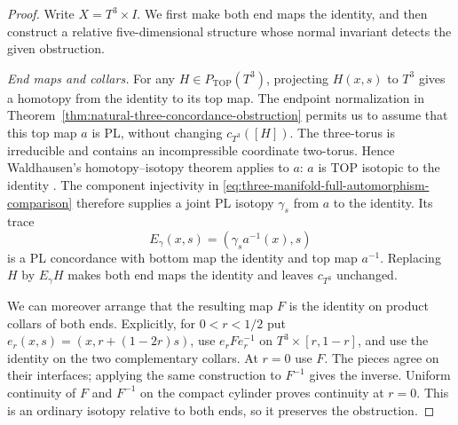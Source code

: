 \begin{proof}
Write $X=T^3\times I$.  We first make both end maps the
identity, and then construct a relative five-dimensional
structure whose normal invariant detects the given obstruction.

\emph{End maps and collars.}
For any $H\in P_{\mathrm{TOP}}(T^3)$, projecting $H(x,s)$
to $T^3$ gives a homotopy from the identity to its top map.
The endpoint normalization in
Theorem~\ref{thm:natural-three-concordance-obstruction}
permits us to assume that this top map $a$ is PL, without
changing $c_{T^3}([H])$.  The three-torus is irreducible and
contains an incompressible coordinate two-torus.  Hence
Waldhausen's homotopy--isotopy theorem applies to $a$:
$a$ is TOP isotopic to the identity
\cite[Theorem~7.1, pp.~80--81; proof pp.~81--85]{Waldhausen1968}.
The component injectivity in
\eqref{eq:three-manifold-full-automorphism-comparison}
therefore supplies a joint PL isotopy $\gamma_s$ from $a$
to the identity.  Its trace
\[
 E_\gamma(x,s)=(\gamma_s a^{-1}(x),s)
\]
is a PL concordance with bottom map the identity and top
map $a^{-1}$.  Replacing $H$ by $E_\gamma H$ makes both
end maps the identity and leaves $c_{T^3}$ unchanged.

We can moreover arrange that the resulting map $F$ is the
identity on product collars of both ends.  Explicitly, for
$0<r<1/2$ put $e_r(x,s)=(x,r+(1-2r)s)$, use
$e_rFe_r^{-1}$ on $T^3\times[r,1-r]$, and use the identity
on the two complementary collars.  At $r=0$ use $F$.
The pieces agree on their interfaces; applying the same
construction to $F^{-1}$ gives the inverse.  Uniform
continuity of $F$ and $F^{-1}$ on the compact cylinder
proves continuity at $r=0$.  This is an ordinary isotopy
relative to both ends, so it preserves the obstruction.


\end{proof}

